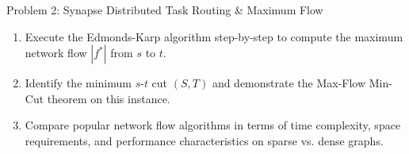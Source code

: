 \documentclass[11pt, a4paper]{article}
\begin{document}
\begin{problembox}{Problem 2: Synapse Distributed Task Routing \& Maximum Flow}
  \begin{enumerate}[label=\textbf{(\alph*)}, leftmargin=1.5em, itemsep=0.5pt]
    \item Execute the Edmonds-Karp algorithm step-by-step to compute the maximum network flow $|f^*|$ from $s$ to $t$.
    \item Identify the minimum $s$-$t$ cut $(S, T)$ and demonstrate the Max-Flow Min-Cut theorem on this instance.
    \item Compare popular network flow algorithms in terms of time complexity, space requirements, and performance characteristics on sparse vs. dense graphs.
  \end{enumerate}
\end{problembox}

\vspace{2pt}
\end{document}
